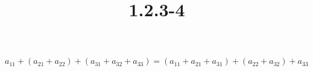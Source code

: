 \documentclass{article}
\title{1.2.3-4}
\begin{document}
\maketitle

$a_{11} + (a_{21} + a_{22}) + (a_{31} + a_{32} + a_{33}) = (a_{11} + a_{21} + a_{31}) + (a_{22} + a_{32}) + a_{33}$
\end{document}
